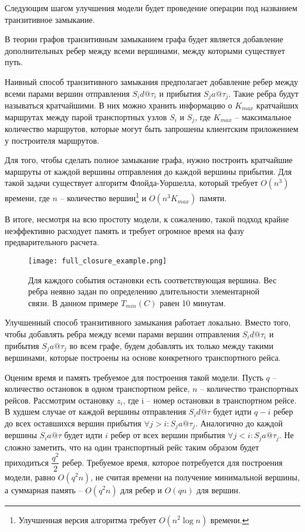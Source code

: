 Следующим шагом улучшения модели будет проведение операции под названием транзитивное замыкание.

\begin{definition}
	В теории графов транзитивным замыканием графа будет является добавление дополнительных ребер между всеми вершинами, между которыми существует путь.
\end{definition}

Наивный способ транзитивного замыкания предполагает добавление ребер между всеми парами вершин отправления $S_id@\tau_i$ и прибытия $S_ja@\tau_j$. Такие ребра будут называться кратчайшими. В них можно хранить информацию о $K_{max}$ кратчайших маршрутах между парой транспортных узлов $S_i$ и $S_j$, где $K_{max}$ -- максимальное количество маршрутов, которые могут быть запрошены клиентским приложением у построителя маршрутов. 

Для того, чтобы сделать полное замыкание графа, нужно построить кратчайшие маршруты от каждой вершины отправления до каждой вершины прибытия. Для такой задачи существует алгоритм Флойда-Уоршелла, который требует $O(n^3)$ времени, где $n$ -- количество вершин\footnote{Улучшенная версия алгоритма требует $O(n^2\log n)$ времени.} и $O(n^3K_{max})$ памяти.

В итоге, несмотря на всю простоту модели, к сожалению, такой подход крайне неэффективно расходует память и требует огромное время на фазу предварительного расчета. 

\begin{figure}[!h]
	\centering
	\texttt{[image: full\_closure\_example.png]}
	\caption{Для каждого события остановки есть соответствующая вершина. Вес ребра неявно задан по определению длительности элементарной связи. В данном примере $T_{min}(C)$ равен 10 минутам.}\label{fig4}
\end{figure}

Улучшенный способ транзитивного замыкания работает локально. Вместо того, чтобы добавлять ребра между всеми парами вершин отправления $S_id@\tau_i$ и прибытия $S_ja@\tau_j$ во всем графе, будем добавлять их только между такими вершинами, которые построены на основе конкретного транспортного рейса.

Оценим время и память требуемое для построения такой модели. Пусть $q$ -- количество остановок в одном транспортном рейсе, $n$ -- количество транспортных рейсов. Рассмотрим остановку $z_i$, где i -- номер остановки в транспортном рейсе. В худшем случае от каждой вершины отправления $S_id@\tau$ будет идти $q-i$ ребер до всех оставшихся вершин прибытия $\forall j > i : S_ja@\tau_j$. Аналогично до каждой вершины $S_ia@\tau$ будет идти $i$ ребер от всех вершин прибытия $\forall j < i : S_ja@\tau_j$. Не сложно заметить, что на один транспортный рейс таким образом будет приходиться $\dfrac{q^2}{2}$ ребер. Требуемое время, которое потребуется для построения модели, равно $O(q^2n)$, не считая времени на получение минимальной вершины, а суммарная память -- $O(q^2n)$ для ребер и $O(qn)$ для вершин.

